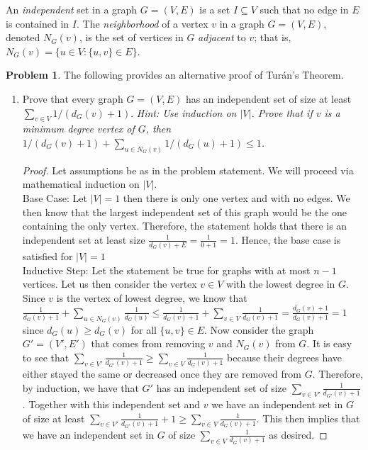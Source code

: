 \documentclass[11pt, letter]{amsart}
\theoremstyle{definition}
\newtheorem{problem}{Problem}[]
\begin{document}
\clearpage
An \textit{independent} set in a graph $G = (V, E)$ is a set $I \subseteq V$ such that no edge in $E$ is contained in $I$.  The \textit{neighborhood} of a vertex $v$ in a graph $G = (V, E)$, denoted $N_G(v)$, is the set of vertices in $G$ \textit{adjacent} to $v$; that is, $N_G(v) = \{u \in V : \{u, v\} \in E\}$.
\begin{problem}The following provides an alternative proof of Tur\'an's Theorem.
  \begin{enumerate}[label=(\alph*)]
  \item Prove that every graph $G = (V, E)$ has an independent set of size at least $\sum_{v \in V}1 / (d_G(v) + 1)$. \textit{Hint: Use induction on $|V|$.  Prove that if $v$ is a minimum degree vertex of $G$, then $1/(d_G(v) + 1) + \sum_{u \in N_G(v)}1/(d_G(u) + 1) \leq 1$.}

    \begin{proof}
        Let assumptions be as in the problem statement. We will proceed via mathematical induction on $|V|$.\\
        Base Case: Let $|V| = 1$ then there is only one vertex and with no edges. We then know that the largest independent set of this graph would be the one containing the only vertex. Therefore, the statement holds that there is an independent set at least size $\frac{1}{d_G(v) + E} = \frac{1}{0 + 1} = 1$. Hence, the base case is satisfied for $\left|V\right| = 1$
        \\
        Inductive Step: Let the statement be true for graphs with at most $n - 1$ vertices. Let us then consider the vertex $v\in V$ with the lowest degree in $G$. Since $v$ is the vertex of lowest degree, we know that $\frac{1}{d_G(v) + 1} + \sum_{u\in N_G(v)}\frac{1}{d_G(u)}\leq \frac{1}{d_G(v) + 1} + \sum_{v\in V}\frac{1}{d_G(v) + 1} = \frac{d_G(v) + 1}{d_G(v) + 1} = 1$ since $d_G(u) \geq d_G(v)$ for all $\{u, v\}\in E$. Now consider the graph $G' = (V', E')$ that comes from removing $v$ and $N_G(v)$ from $G$. It is easy to see that $\sum_{v\in V'}\frac{1}{d_{G'}(v) + 1} \geq \sum_{v\in V}\frac{1}{d_G(v) + 1}$ because their degrees have either stayed the same or decreased once they are removed from $G.$ Therefore, by induction, we have that $G'$ has an independent set of size $\sum_{v\in V'}\frac{1}{d_{G'}(v) + 1}$. Together with this independent set and $v$ we have an independent set in $G$ of size at least $\sum_{v\in V'}\frac{1}{d_{G'}(v) + 1} + 1 \geq \sum_{v\in V}\frac{1}{d_G(v) + 1}$. This then implies that we have an independent set in $G$ of size $\sum_{v\in V}\frac{1}{d_G(v) + 1}$ as desired.
    \end{proof}
  

\end{enumerate}
\end{problem}
\end{document}
